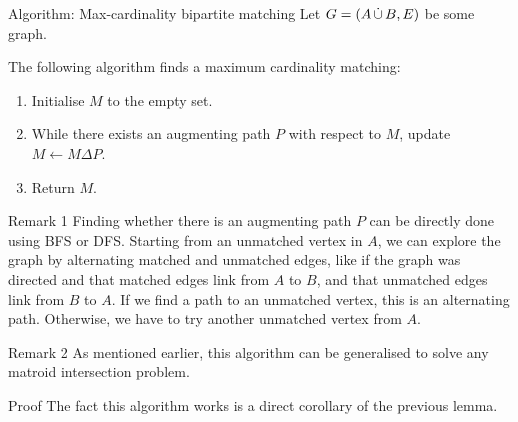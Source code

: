 \documentclass[a4paper]{article}
\begin{document}
\begin{parag}{Algorithm: Max-cardinality bipartite matching}
    Let $G = \left(A \dcup B, E\right)$ be some graph.

    The following algorithm finds a maximum cardinality matching:
    \begin{enumerate}
        \item Initialise $M$ to the empty set.
        \item While there exists an augmenting path $P$ with respect to $M$, update $M \leftarrow M \Delta P$.
        \item Return $M.$
    \end{enumerate}
   
    \begin{subparag}{Remark 1}
        Finding whether there is an augmenting path $P$ can be directly done using BFS or DFS. Starting from an unmatched vertex in $A$, we can explore the graph by alternating matched and unmatched edges, like if the graph was directed and that matched edges link from $A$ to $B$, and that unmatched edges link from $B$ to $A$. If we find a path to an unmatched vertex, this is an alternating path. Otherwise, we have to try another unmatched vertex from $A$. 
    \end{subparag}

    \begin{subparag}{Remark 2}
        As mentioned earlier, this algorithm can be generalised to solve any matroid intersection problem.
    \end{subparag}

    \begin{subparag}{Proof}
        The fact this algorithm works is a direct corollary of the previous lemma.
    \end{subparag}
\end{parag}
\end{document}
